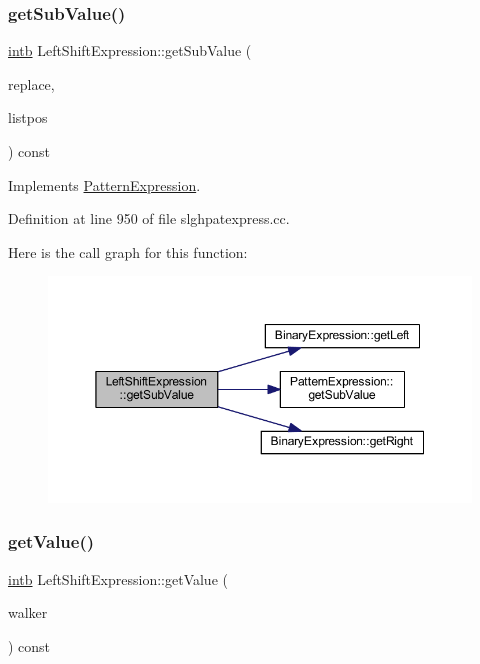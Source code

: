 \subsubsection{\texorpdfstring{getSubValue()}{getSubValue()}}
{\footnotesize\ttfamily \mbox{\hyperlink{types_8h_aa925ba3e627c2df89d5b1cfe84fb8572}{intb}} Left\+Shift\+Expression\+::get\+Sub\+Value (\begin{DoxyParamCaption}\item[{const vector$<$ \mbox{\hyperlink{types_8h_aa925ba3e627c2df89d5b1cfe84fb8572}{intb}} $>$ \&}]{replace,  }\item[{int4 \&}]{listpos }\end{DoxyParamCaption}) const\hspace{0.3cm}{\ttfamily [virtual]}}



Implements \mbox{\hyperlink{class_pattern_expression_ade37db4aa76dd442b189bf4a6bb2d9dd}{Pattern\+Expression}}.



Definition at line 950 of file slghpatexpress.\+cc.

Here is the call graph for this function\+:
\nopagebreak
\begin{figure}[H]
\begin{center}
\leavevmode
\includegraphics[width=350pt]{class_left_shift_expression_a7c77ac72cf7367db152a535bb07bb2dd_cgraph}
\end{center}
\end{figure}
\mbox{\label{class_left_shift_expression_a5d12d4e5dd1ae8ce9bc88695b9bdf736}} 
\subsubsection{\texorpdfstring{getValue()}{getValue()}}
{\footnotesize\ttfamily \mbox{\hyperlink{types_8h_aa925ba3e627c2df89d5b1cfe84fb8572}{intb}} Left\+Shift\+Expression\+::get\+Value (\begin{DoxyParamCaption}\item[{\mbox{\hyperlink{class_parser_walker}{Parser\+Walker}} \&}]{walker }\end{DoxyParamCaption}) const\hspace{0.3cm}{\ttfamily [virtual]}}



